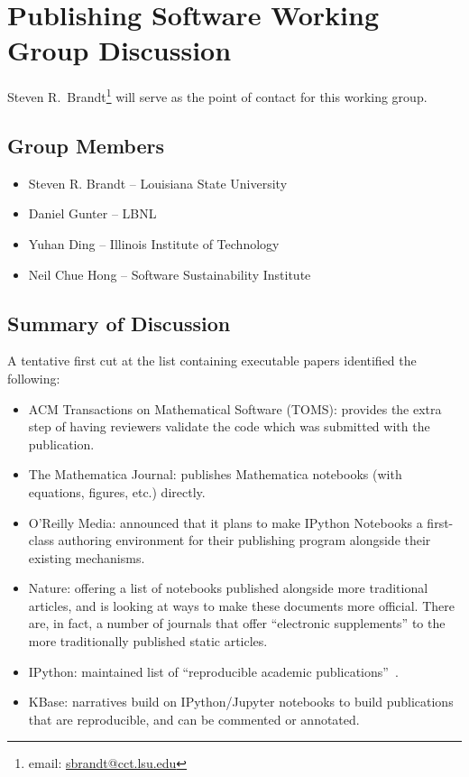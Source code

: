 \section{Publishing Software Working Group Discussion}
\label{sec:appendix_publishing_SW}

Steven R.\ Brandt\footnote{email:
\href{mailto:sbrandt@cct.lsu.edu}{sbrandt@cct.lsu.edu}} will serve as the point
of contact for this working group.

\subsection{Group Members}

\begin{itemize}
\item Steven R. Brandt -- Louisiana State University
\item Daniel Gunter -- LBNL
\item Yuhan Ding -- Illinois Institute of Technology
\item Neil Chue Hong -- Software Sustainability Institute
\end{itemize}

\subsection{Summary of Discussion}

A tentative first cut at the list containing executable papers identified the following:
\begin{itemize}

\item ACM Transactions on Mathematical Software (TOMS): provides the extra step
of having reviewers validate the code which was submitted with the publication.
 
\item The Mathematica Journal: publishes Mathematica notebooks (with equations,
figures, etc.) directly.

\item O'Reilly Media: announced that it plans to make IPython Notebooks a
first-class authoring environment for their publishing program alongside their
existing mechanisms.

\item Nature: offering a list of notebooks published alongside more traditional
articles, and is looking at ways to make these documents more official. There
are, in fact, a number of journals that offer ``electronic supplements'' to the
more traditionally published static articles.

\item IPython: maintained list of ``reproducible academic
publications''~\cite{ipython-pubs}.

\item KBase: narratives build on IPython\slash Jupyter notebooks to build
publications that are reproducible, and can be commented or annotated.
  
\end{itemize}

